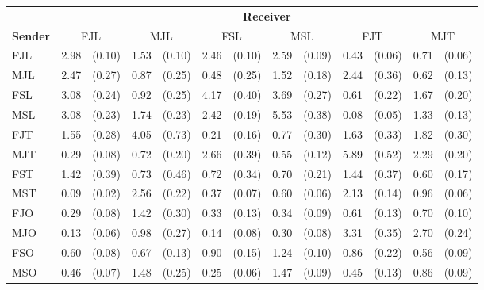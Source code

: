 
\begin{tabular}{lrrrrrrrrrrrr}
\toprule
    & \multicolumn{12}{c}{\textbf{Receiver}} \\
    \cmidrule(l){2- 13 }
\textbf{Sender}
    & \multicolumn{2}{c}{\textnormal{FJL}}
    & \multicolumn{2}{c}{\textnormal{MJL}}
    & \multicolumn{2}{c}{\textnormal{FSL}}
    & \multicolumn{2}{c}{\textnormal{MSL}}
    & \multicolumn{2}{c}{\textnormal{FJT}}
    & \multicolumn{2}{c}{\textnormal{MJT}} \\
    \cmidrule(l){1-1}
    \cmidrule(lr){2-3}
    \cmidrule(lr){4-5}
    \cmidrule(lr){6-7}
    \cmidrule(lr){8-9}
    \cmidrule(lr){10-11}
    \cmidrule(lr){12-13}
    \textnormal{FJL} & 2.98 & (0.10) & 1.53 & (0.10) & 2.46 & (0.10) & 2.59 & (0.09) & 0.43 & (0.06) & 0.71 & (0.06) \\
    \textnormal{MJL} & 2.47 & (0.27) & 0.87 & (0.25) & 0.48 & (0.25) & 1.52 & (0.18) & 2.44 & (0.36) & 0.62 & (0.13) \\
    \textnormal{FSL} & 3.08 & (0.24) & 0.92 & (0.25) & 4.17 & (0.40) & 3.69 & (0.27) & 0.61 & (0.22) & 1.67 & (0.20) \\
    \textnormal{MSL} & 3.08 & (0.23) & 1.74 & (0.23) & 2.42 & (0.19) & 5.53 & (0.38) & 0.08 & (0.05) & 1.33 & (0.13) \\
    \textnormal{FJT} & 1.55 & (0.28) & 4.05 & (0.73) & 0.21 & (0.16) & 0.77 & (0.30) & 1.63 & (0.33) & 1.82 & (0.30) \\
    \textnormal{MJT} & 0.29 & (0.08) & 0.72 & (0.20) & 2.66 & (0.39) & 0.55 & (0.12) & 5.89 & (0.52) & 2.29 & (0.20) \\
    \textnormal{FST} & 1.42 & (0.39) & 0.73 & (0.46) & 0.72 & (0.34) & 0.70 & (0.21) & 1.44 & (0.37) & 0.60 & (0.17) \\
    \textnormal{MST} & 0.09 & (0.02) & 2.56 & (0.22) & 0.37 & (0.07) & 0.60 & (0.06) & 2.13 & (0.14) & 0.96 & (0.06) \\
    \textnormal{FJO} & 0.29 & (0.08) & 1.42 & (0.30) & 0.33 & (0.13) & 0.34 & (0.09) & 0.61 & (0.13) & 0.70 & (0.10) \\
    \textnormal{MJO} & 0.13 & (0.06) & 0.98 & (0.27) & 0.14 & (0.08) & 0.30 & (0.08) & 3.31 & (0.35) & 2.70 & (0.24) \\
    \textnormal{FSO} & 0.60 & (0.08) & 0.67 & (0.13) & 0.90 & (0.15) & 1.24 & (0.10) & 0.86 & (0.22) & 0.56 & (0.09) \\
    \textnormal{MSO} & 0.46 & (0.07) & 1.48 & (0.25) & 0.25 & (0.06) & 1.47 & (0.09) & 0.45 & (0.13) & 0.86 & (0.09) \\
\end{tabular}

